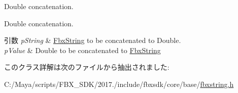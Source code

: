 Double concatenation. 

Double concatenation. 
\begin{DoxyParams}{引数}
{\em p\+String} & \hyperlink{class_fbx_string}{Fbx\+String} to be concatenated to Double. \\
\hline
{\em p\+Value} & Double to be concatenated to \hyperlink{class_fbx_string}{Fbx\+String} \\
\hline
\end{DoxyParams}


このクラス詳解は次のファイルから抽出されました\+:\begin{DoxyCompactItemize}
\item 
C\+:/\+Maya/scripts/\+F\+B\+X\+\_\+\+S\+D\+K/2017./include/fbxsdk/core/base/\hyperlink{fbxstring_8h}{fbxstring.\+h}\end{DoxyCompactItemize}
